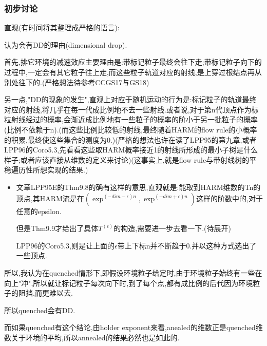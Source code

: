 \documentclass[a4paper,oneside]{ctexbook}
\begin{document}
			\qquad 

			\qquad 

			

			

			

		\subsubsection*{初步讨论}

			直观(有时间将其整理成严格的语言):

				\begin{conjec}

					认为会有DD的理由(dimensional drop).

					首先,排它环境的减速效应主要理由是:带标记粒子最终会往下走;带标记粒子向下的过程中,一定会有其它粒子往上走,而这些粒子轨道对应的射线,是上穿过根结点再从别处往下的.(严格想法待参考CCGS17与GS18)

					另一点,"DD的现象的发生",直观上对应于随机运动的行为是:标记粒子的轨道最终对应的射线,将几乎在每一代成比例地不去一些射线.或者说,对于第n代顶点作为标粒射线经过的概率,会渐近成比例地有一些粒子的概率的阶小于另一批粒子的概率(比例不依赖于n).(而这些比例比较低的射线,最终随着HARM的flow rule的小概率的积累,最终使这些集合的测度为0.)(严格的想法也许在读了LPP95的第九章,或者LPP96的Coro5.3,先看看这些取HARM概率接近1的射线所形成的最小子树是什么样子;或者应该直接从维数的定义来讨论)(这事实上,就是flow rule与带射线树的平稳遍历性所想实现的结果.)

						\begin{itemize}
							\item 

							文章LPP95E的Thm9.8的确有这样的意思,直观就是:能取到HARM维数的Tn的顶点,其HARM流是在$(\exp^{(-dim-\epsilon)n},\exp^{(-dim+\epsilon)n})$这样的阶数中的,对于任意的epsilon.

							但是Thm9.9才给出了具体$T^(\epsilon)$的构造,需要进一步去看一下.(待展开)

							LPP96的Coro5.3,则是让上面的$\epsilon$带上下标n并不断趋于0.并以这种方式选出了一些顶点.
						\end{itemize}

					所以,我认为在quenched情形下,即假设环境粒子给定时,由于环境粒子始终有一些在向上"冲",所以就让标记粒子每次向下时,到了每个点,都有成比例的后代因为环境粒子的阻挡,而更难以去.

					所以quenched会有DD.

					而如果quenched有这个结论,由holder exponent来看,anealed的维数正是quenched维数关于环境的平均,所以annealed的结果必然也是如此的.
				\end{conjec}
\end{document}
